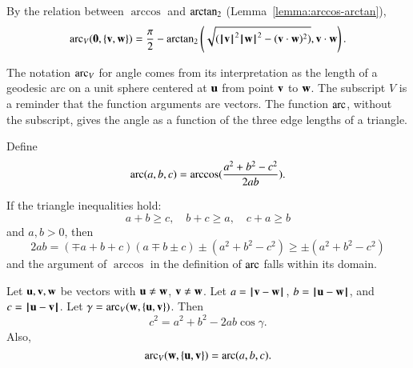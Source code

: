 By the relation between $\arccos$ and ${\operatorname{arctan_2}}$
(Lemma~\ref{lemma:arccos-arctan}), %
\begin{equation}\label{eqn:angle}
  \operatorname{arc}_V({\mathbf 0},\{{\mathbf v},{\mathbf w}\}) = \frac{\pi}2 - {\operatorname{arctan_2}}\left ({\sqrt{({{\hskip0.1em|\hskip-0.15em|\hskip0.1em}{\mathbf v}{\hskip0.1em|\hskip-0.15em|\hskip0.1em}}^2{{\hskip0.1em|\hskip-0.15em|\hskip0.1em}{\mathbf w}{\hskip0.1em|\hskip-0.15em|\hskip0.1em}}^2 -
        ({\mathbf v}\cdot {\mathbf w})^2)}}, {{\mathbf v}\cdot {\mathbf w}}\right).
\end{equation}
%

The notation $\operatorname{arc}_V$ for angle comes from its interpretation as the
length of a geodesic arc on a unit sphere
centered at ${\mathbf u}$ from point ${\mathbf v}$ to ${\mathbf w}$.
%
The subscript $V$ is a reminder that
the function arguments are vectors.  The function
$\operatorname{arc}$, without the subscript,  gives the angle as a function
of the three edge lengths of a triangle.
%
%
%


\begin{definition}[arc]\label{def:arc}
Define
\begin{displaymath}\operatorname{arc}(a,b,c) = \arccos(\frac{a^2 + b^2 - c^2}{2 a
    b}).\end{displaymath}
%
\end{definition}

If the triangle inequalities hold:
\begin{displaymath}
a + b \ge c,\quad b + c \ge a, \quad c+a \ge b
\end{displaymath}
and $a,b >0$, then
\begin{displaymath}
  2 a b = (\mp a+b+c)(a \mp b \pm c) \pm (a^2 + b^2 - c^2) 
\ge \pm  (a^2 + b^2 - c^2)
\end{displaymath}
and the argument of $\arccos$ in the definition of $\operatorname{arc}$ falls within
its domain.

\begin{lemma}\label{lemma:loc}
Let ${\mathbf u},{\mathbf v},{\mathbf w}$ be vectors with ${\mathbf u}\ne {\mathbf w}$, ${\mathbf v}\ne {\mathbf w}$.  Let $a
= \norm{\v }{ \w}$, $b = \norm{\u }{ \w}$, and $c = \norm{\u }{ \v}$.
Let $\gamma=\operatorname{arc}_V({\mathbf w},\{{\mathbf u},{\mathbf v}\})$.    Then
\begin{displaymath}c^2 = a^2 + b^2 - 2 a b \cos\gamma.\end{displaymath}
Also,
\begin{displaymath}
\operatorname{arc}_V({\mathbf w},\{{\mathbf u},{\mathbf v}\})= \operatorname{arc}(a,b,c).
\end{displaymath}

\end{lemma}
%
%
%
%

